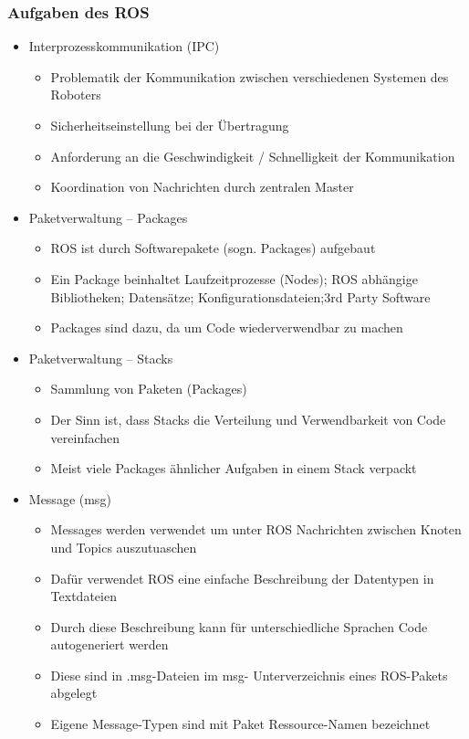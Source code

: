 \subsubsection*{Aufgaben des ROS}
\begin{itemize}
 \item Interprozesskommunikation (IPC)
 \begin{itemize}
\item Problematik der Kommunikation zwischen verschiedenen Systemen des Roboters
\item Sicherheitseinstellung bei der Übertragung
\item Anforderung an die Geschwindigkeit / Schnelligkeit der Kommunikation
\item Koordination von Nachrichten durch zentralen Master
\end{itemize}
\item Paketverwaltung – Packages
\begin{itemize}
 \item ROS ist durch Softwarepakete (sogn. Packages) aufgebaut
 \item Ein Package beinhaltet Laufzeitprozesse (Nodes); ROS abhängige Bibliotheken;
Datensätze; Konfigurationsdateien;3rd Party Software
 \item Packages sind dazu, da um Code wiederverwendbar zu machen
\end{itemize}
\item Paketverwaltung – Stacks
\begin{itemize}
\item Sammlung von Paketen (Packages)
\item Der Sinn ist, dass Stacks die Verteilung und Verwendbarkeit von Code
vereinfachen
\item Meist viele Packages ähnlicher Aufgaben in einem Stack verpackt
\end{itemize}
\item Message (msg)
\begin{itemize}
 \item  Messages werden verwendet um unter ROS Nachrichten zwischen Knoten und
Topics auszutuaschen
\item Dafür verwendet ROS eine einfache Beschreibung der Datentypen in Textdateien
\item Durch diese Beschreibung kann für unterschiedliche Sprachen Code autogeneriert
werden
\item Diese sind in .msg-Dateien im msg- Unterverzeichnis eines ROS-Pakets abgelegt
\item Eigene Message-Typen sind mit Paket Ressource-Namen bezeichnet

\end{itemize}
\end{itemize}
